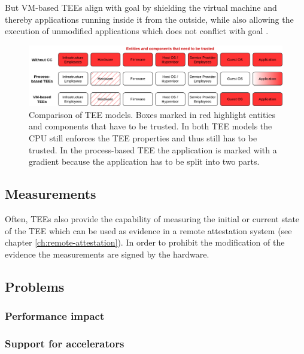 But VM-based TEEs align with goal  by shielding the virtual
machine and thereby applications running inside it from the outside, while also
allowing the execution of unmodified applications which does not conflict with
goal .

\begin{figure}
  \centering
  \includegraphics[width=\linewidth]{resources/cc-tee-comparison.png}
  \caption[Comparison of trusted execution environment models]{
    Comparison of TEE models. Boxes marked in red highlight entities and
    components that have to be trusted. In both TEE models the CPU still
    enforces the TEE properties and thus still has to be trusted. In the
    process-based TEE the application is marked with a gradient because the
    application has to be split into two parts.
  }
  \label{figure:cc-tee-comparison}
\end{figure}

\subsection{Measurements}

Often, TEEs also provide the capability of measuring the initial or current
state of the TEE which can be used as evidence in a remote attestation system
(see chapter \ref{ch:remote-attestation}). In order to prohibit the modification
of the evidence the measurements are signed by the hardware.

\subsection{Problems}

\subsubsection{Performance impact}


\subsubsection{Support for accelerators}

